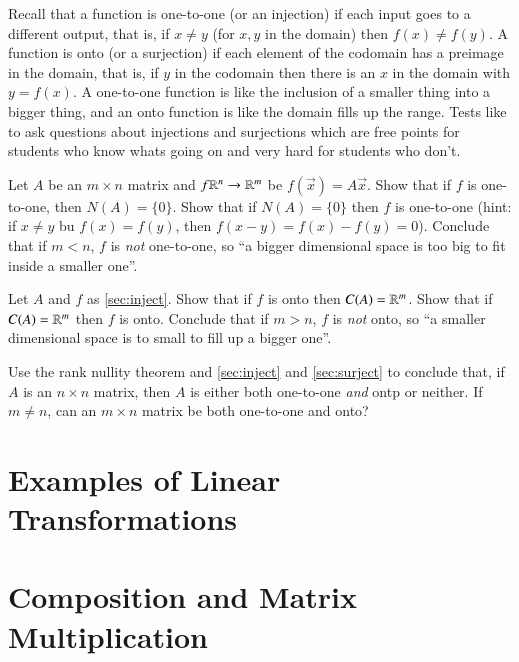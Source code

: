 Recall that a function is one-to-one (or an injection) if each input goes to a different output, that is, if $x\ne y$ (for $x,y$ in the domain) then $f(x)\ne f(y)$.
A function is onto (or a surjection) if each element of the codomain has a preimage in the domain, that is, if $y$ in the codomain then there is an $x$ in the domain with $y=f(x)$.  
A one-to-one function is like the inclusion of a smaller thing into a bigger thing, and an onto function is like the domain fills up the range.  
Tests like to ask questions about injections and surjections which are free points for students who know whats going on and very hard for students who don't.  

\begin{ImpEasyEx}
  \label{sec:inject}
  Let $A$ be an $m\times n$ matrix and $f\mathbb{R}^n\to \mathbb{R}^m$ be $f(\vec{x}) = A\vec{x}$.
  Show that if $f$ is one-to-one, then $N(A)=\{0\}$.  
  Show that if $N(A)=\{0\}$ then $f$ is one-to-one (hint: if $x\ne y$ bu $f(x)=f(y)$, then $f(x-y)=f(x)-f(y)=0$).
  Conclude that if $m< n$, $f$ is \emph{not} one-to-one, so ``a bigger dimensional space is too big to fit inside a smaller one''.
\end{ImpEasyEx}

\begin{ImpEasyEx}
  \label{sec:surject}
  Let $A$ and $f$ as \ref{sec:inject}.  
  Show that if $f$ is onto then $C(A)=\mathbb{R}^m$.
  Show that if $C(A)=\mathbb{R}^m$ then $f$ is onto.  
  Conclude that if $m> n$, $f$ is \emph{not} onto, so ``a smaller dimensional space is to small to fill up a bigger one''.
\end{ImpEasyEx}

\begin{ImpEasyEx}
  \label{sec:surjandinj}
  Use the rank nullity theorem and \ref{sec:inject} and \ref{sec:surject} to conclude that, if $A$ is an $n\times n$ matrix, then $A$ is either both one-to-one \emph{and} ontp or neither.  
  If $m\ne n$, can an $m\times n$ matrix be both one-to-one and onto?
\end{ImpEasyEx}

\exersisesm

\section{Examples of Linear Transformations}



\exersisesn

\section{Composition and Matrix Multiplication}

